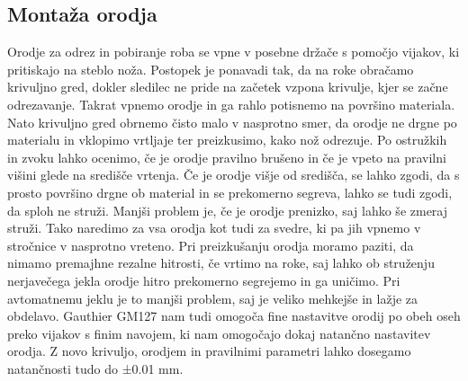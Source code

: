 \subsection{Montaža orodja}
Orodje za odrez in pobiranje roba se vpne v posebne držače
s pomočjo vijakov, ki pritiskajo na steblo noža. Postopek je ponavadi tak,
da na roke obračamo krivuljno gred, dokler sledilec ne pride
na začetek vzpona krivulje, kjer se začne odrezavanje. Takrat vpnemo orodje
in ga rahlo potisnemo na površino materiala. Nato krivuljno gred
obrnemo čisto malo v nasprotno smer, da orodje ne drgne po materialu
in vklopimo vrtljaje ter preizkusimo, kako nož odrezuje. Po ostružkih
in zvoku lahko ocenimo, če je orodje pravilno brušeno in če je vpeto
na pravilni višini glede na središče vrtenja. Če je orodje višje od
središča, se lahko zgodi, da s prosto površino drgne ob material in
se prekomerno segreva, lahko se tudi zgodi, da sploh ne struži.
Manjši problem je, če je orodje prenizko, saj lahko še zmeraj
struži. Tako naredimo za vsa orodja kot tudi za svedre,
ki pa jih vpnemo v stročnice v nasprotno vreteno. Pri preizkušanju
orodja moramo paziti, da nimamo premajhne rezalne hitrosti, če
vrtimo na roke, saj lahko ob struženju nerjavečega jekla orodje
hitro prekomerno segrejemo in ga uničimo. Pri avtomatnemu jeklu
je to manjši problem, saj je veliko mehkejše in lažje za obdelavo.
Gauthier GM127 nam tudi omogoča fine nastavitve orodij po obeh oseh
preko vijakov s finim navojem, ki nam omogočajo dokaj natančno
nastavitev orodja. Z novo krivuljo, orodjem in pravilnimi parametri
lahko dosegamo natančnosti tudo do ±0.01 mm.

